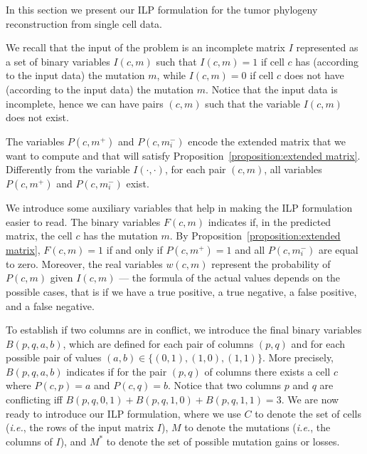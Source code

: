 \documentclass[a4paper,USenglish]{article}
\newcommand{\ie}{\emph{i.e.}}
\theoremstyle{definition}
\begin{document}
In this section we present our ILP formulation for the tumor phylogeny
reconstruction from single cell data.

We recall that the input of the problem is an incomplete matrix $I$
represented as a set of binary variables $I(c,m)$ such that $I(c,m)=1$
if cell $c$ has (according to the input data) the mutation $m$, while
$I(c,m)=0$ if cell $c$ does not have (according to the input data) the
mutation $m$.
%
Notice that the input data is incomplete, hence we can have pairs
$(c,m)$ such that the variable $I(c,m)$ does not exist.

The variables $P(c,m^{+})$ and $P(c,m_{i}^{-})$ encode the extended
matrix that we want to compute and that will satisfy
Proposition~\ref{proposition:extended matrix}.  Differently from the
variable $I(\cdot,\cdot)$, for each pair $(c,m)$, all variables
$P(c,m^{+})$ and $P(c,m_{i}^{-})$ exist.

We introduce some auxiliary variables that help in making the ILP
formulation easier to read.  The binary variables $F(c,m)$ indicates
if, in the predicted matrix, the cell $c$ has the mutation $m$.  By
Proposition~\ref{proposition:extended matrix}, $F(c,m)=1$ if and only
if $P(c,m^{+})=1$ and all $P(c,m_{i}^{-})$ are equal to zero.
Moreover, the real variables $w(c,m)$ represent the probability of
$P(c,m)$ given $I(c,m)$ --- the formula of the actual values depends
on the possible cases, that is if we have a true positive, a true
negative, a false positive, and a false negative.

To establish if two columns are in conflict, we introduce the final
binary variables $B(p,q,a,b)$, which are defined for each pair of
columns $(p,q)$ and for each possible pair of values
$(a,b)\in \{(0,1), (1,0), (1,1)\}$.  More precisely, $B(p,q,a,b)$
indicates if for the pair $(p,q)$ of columns there exists a cell $c$
where $P(c,p)=a$ and $P(c,q)=b$.  Notice that two columns $p$ and $q$
are conflicting iff $B(p,q,0,1) + B(p,q,1,0) + B(p,q,1,1) = 3$.  We
are now ready to introduce our ILP formulation, where we use $C$ to
denote the set of cells (\ie, the rows of the input matrix $I$), $M$
to denote the mutations (\ie, the columns of $I$), and $M^{*}$ to
denote the set of possible mutation gains or losses.
\end{document}
